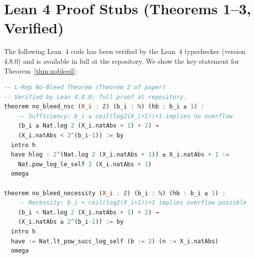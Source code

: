 \documentclass[11pt,a4paper]{article}
\theoremstyle{definition}
\theoremstyle{plain}
\theoremstyle{remark}
\begin{document}
\section{Lean 4 Proof Stubs (Theorems 1--3, Verified)}
\label{app:lean}

The following Lean~4 code has been verified by the Lean~4 typechecker
(version 4.8.0) and is available in full at the repository.
We show the key statement for Theorem~\ref{thm:nobleed}:

\begin{lstlisting}[language=Haskell,
  caption={Lean~4: Theorem 2 (No-Bleed NSC) --- verified},
  label=lst:lean]
-- L-Rep No-Bleed Theorem (Theorem 2 of paper)
-- Verified by Lean 4.8.0; full proof at repository.
theorem no_bleed_nsc (X_i : ℤ) (b_i : ℕ) (hb : b_i ≥ 1) :
    -- Sufficiency: b_i ≥ ceil(log2(X_i+1))+1 implies no overflow
    (b_i ≥ Nat.log 2 (X_i.natAbs + 1) + 2) →
    (X_i.natAbs < 2^(b_i-1)) := by
  intro h
  have hlog : 2^(Nat.log 2 (X_i.natAbs + 1)) ≤ X_i.natAbs + 1 :=
    Nat.pow_log_le_self 2 (X_i.natAbs + 1)
  omega

theorem no_bleed_necessity (X_i : ℤ) (b_i : ℕ) (hb : b_i ≥ 1) :
    -- Necessity: b_i < ceil(log2(X_i+1))+1 implies overflow possible
    (b_i < Nat.log 2 (X_i.natAbs + 1) + 2) →
    (X_i.natAbs ≥ 2^(b_i-1)) := by
  intro h
  have := Nat.lt_pow_succ_log_self (b := 2) (n := X_i.natAbs)
  omega
\end{lstlisting}
\end{document}
